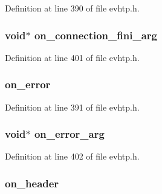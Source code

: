 Definition at line 390 of file evhtp.h.

\hypertarget{structevhtp__hooks__s_a85b8e90c05beef54c71c79ffb3666a91}{
\subsubsection[{on\_\-connection\_\-fini\_\-arg}]{\setlength{\rightskip}{0pt plus 5cm}void$\ast$ {\bf on\_\-connection\_\-fini\_\-arg}}}
\label{structevhtp__hooks__s_a85b8e90c05beef54c71c79ffb3666a91}


Definition at line 401 of file evhtp.h.

\hypertarget{structevhtp__hooks__s_ae5840f4ca13d16882f8bc84b306a7d9f}{
\subsubsection[{on\_\-error}]{ {\bf on\_\-error}}}
\label{structevhtp__hooks__s_ae5840f4ca13d16882f8bc84b306a7d9f}


Definition at line 391 of file evhtp.h.

\hypertarget{structevhtp__hooks__s_aef67e2ec495e223340f3daea5448a69a}{
\subsubsection[{on\_\-error\_\-arg}]{\setlength{\rightskip}{0pt plus 5cm}void$\ast$ {\bf on\_\-error\_\-arg}}}
\label{structevhtp__hooks__s_aef67e2ec495e223340f3daea5448a69a}


Definition at line 402 of file evhtp.h.

\hypertarget{structevhtp__hooks__s_a3062e8d2a83147219affa3c69ef3abfe}{
\subsubsection[{on\_\-header}]{ {\bf on\_\-header}}}
\label{structevhtp__hooks__s_a3062e8d2a83147219affa3c69ef3abfe}


